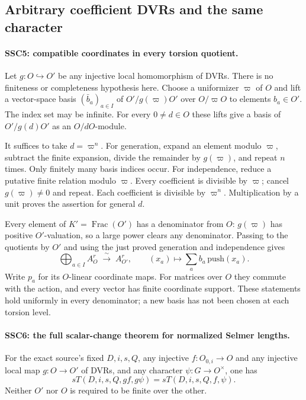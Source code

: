 \documentclass[11pt,a4paper]{article}
\numberwithin{equation}{section}
\theoremstyle{remark}\newtheorem{remark}[theorem]{Remark}
\begin{document}
\subsection{Arbitrary coefficient DVRs and the same character}

\paragraph{SSC5: compatible coordinates in every torsion quotient.}
\label{claim:SSC5}
Let $g:O\hookrightarrow O'$ be any injective local homomorphism
of DVRs. There is no finiteness or completeness hypothesis here.
Choose a uniformizer $\varpi$ of $O$ and lift a vector-space basis
$(\bar b_a)_{a\in I}$ of $O'/g(\varpi)O'$ over $O/\varpi O$
to elements $b_a\in O'$. The index set may be infinite. For every
$0\ne d\in O$ these lifts give a basis of $O'/g(d)O'$ as an
$O/dO$-module.

It suffices to take $d=\varpi^n$. For generation, expand an
element modulo $\varpi$, subtract the finite expansion, divide
the remainder by $g(\varpi)$, and repeat $n$ times. Only finitely
many basis indices occur. For independence, reduce a putative
finite relation modulo $\varpi$. Every coefficient is divisible
by $\varpi$; cancel $g(\varpi)\ne0$ and repeat. Each coefficient
is divisible by $\varpi^n$. Multiplication by a unit proves the
assertion for general $d$.

Every element of $K'=\operatorname{Frac}(O')$ has a denominator
from $O$: $g(\varpi)$ has positive $O'$-valuation, so a large
power clears any denominator. Passing to the quotients by $O'$
and using the just proved generation and independence gives
\[
 \bigoplus_{a\in I} A_O^r \;\xrightarrow{\ \sim\ }\; A_{O'}^r,
 \qquad (x_a)\longmapsto\sum_a b_a\,\mathrm{push}(x_a).        \tag{SSC.9}
\]
Write $p_a$ for its $O$-linear coordinate maps. For matrices over
$O$ they commute with the action, and every vector has finite
coordinate support. These statements hold uniformly in every
denominator; a new basis has not been chosen at each torsion level.

\paragraph{SSC6: the full scalar-change theorem for normalized Selmer lengths.}
\label{claim:SSC6}
For the exact source's fixed $D,i,s,Q$, any injective
$f:O_{0,i}\to O$ and any injective local map $g:O\to O'$ of
DVRs, and any character $\psi:G\to O^\times$, one has
\[
 sT(D,i,s,Q,gf,g\psi)=sT(D,i,s,Q,f,\psi).                     \tag{SSC.10}
\]
Neither $O'$ nor $O$ is required to be finite over the other.
\end{document}
